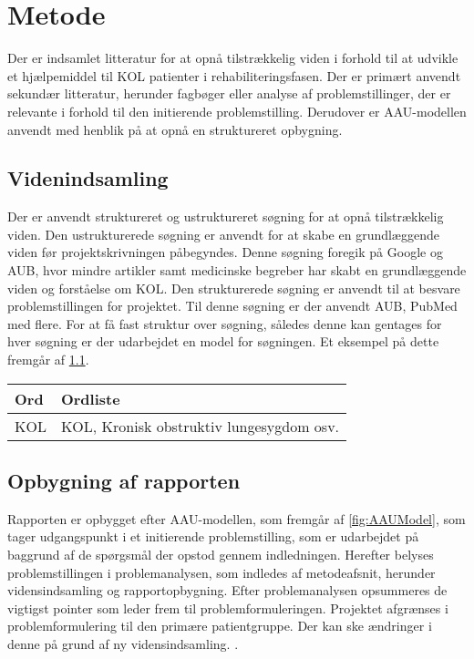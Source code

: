\chapter{Metode}
Der er indsamlet litteratur for at opnå tilstrækkelig viden i forhold til at udvikle et hjælpemiddel til KOL patienter i rehabiliteringsfasen. Der er primært anvendt sekundær litteratur, herunder fagbøger eller analyse af problemstillinger, der er relevante i forhold til den initierende problemstilling. Derudover er AAU-modellen anvendt med henblik på at opnå en struktureret opbygning. 

\section{Videnindsamling}
Der er anvendt struktureret og ustruktureret søgning for at opnå tilstrækkelig viden. Den ustrukturerede søgning er anvendt for at skabe en grundlæggende viden før projektskrivningen påbegyndes. Denne søgning foregik på Google og AUB, hvor mindre artikler samt medicinske begreber har skabt en grundlæggende viden og forståelse om KOL. Den strukturerede søgning er anvendt til at besvare problemstillingen for projektet. Til denne søgning er der anvendt AUB, PubMed med flere. For at få fast struktur over søgning, således denne kan gentages for hver søgning er der udarbejdet en model for søgningen. Et eksempel på dette fremgår af \ref{tab:viden}. 

\begin{table}[H]
\centering
\label{tab:viden}
\begin{tabular}{|l|l|}
\hline
Ord & Ordliste                                 \\ \hline
KOL & KOL, Kronisk obstruktiv lungesygdom osv. \\ \hline
\end{tabular}
\end{table}

\section{Opbygning af rapporten}
Rapporten er opbygget efter AAU-modellen, som fremgår af \ref{fig:AAUModel}, som tager udgangspunkt i et initierende problemstilling, som er udarbejdet på baggrund af de spørgsmål der opstod gennem indledningen. Herefter belyses problemstillingen i problemanalysen, som indledes af metodeafsnit, herunder vidensindsamling og rapportopbygning. Efter problemanalysen opsummeres de vigtigst pointer som leder frem til problemformuleringen. Projektet afgrænses i problemformulering til den primære patientgruppe. Der kan ske ændringer i denne på grund af ny vidensindsamling. .

